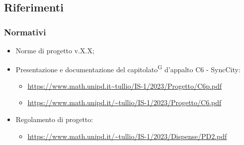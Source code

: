 \documentclass[8pt]{article}
\newcommand{\glossterm}[1]{#1\textsuperscript{G}} %
\begin{document}
\subsection{Riferimenti}
\subsubsection{Normativi}
\begin{itemize}
	\item Norme di progetto v.X.X;
	\item Presentazione e documentazione del \glossterm{capitolato} d’appalto C6 - SyncCity:
	\begin{itemize}
		\item \href{https://www.math.unipd.it/~tullio/IS-1/2023/Progetto/C6p.pdf}{\color{myblue}https://www.math.unipd.it\textasciitilde{}tullio/IS-1/2023/Progetto/C6p.pdf}
		\item \href{https://www.math.unipd.it/~tullio/IS-1/2023/Progetto/C6.pdf}{\color{myblue}https://www.math.unipd.it/\textasciitilde{}tullio/IS-1/2023/Progetto/C6.pdf}
	\end{itemize}
	\item Regolamento di progetto:
	\begin{itemize}
		\item \href{https://www.math.unipd.it/~tullio/IS-1/2023/Dispense/PD2.pdf}{\color{myblue}https://www.math.unipd.it/\textasciitilde{}tullio/IS-1/2023/Dispense/PD2.pdf}
	\end{itemize}
\end{itemize}
\clearpage
\end{document}
